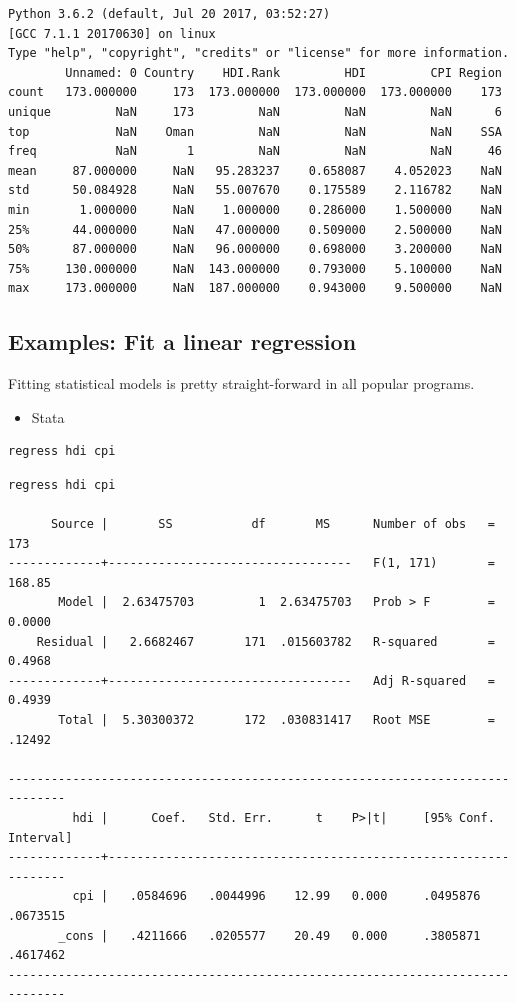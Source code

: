 \documentclass[]{book}
\providecommand{\tightlist}{%
  \setlength{\itemsep}{0pt}\setlength{\parskip}{0pt}}
\begin{document}
\begin{verbatim}
Python 3.6.2 (default, Jul 20 2017, 03:52:27) 
[GCC 7.1.1 20170630] on linux
Type "help", "copyright", "credits" or "license" for more information.
        Unnamed: 0 Country    HDI.Rank         HDI         CPI Region
count   173.000000     173  173.000000  173.000000  173.000000    173
unique         NaN     173         NaN         NaN         NaN      6
top            NaN    Oman         NaN         NaN         NaN    SSA
freq           NaN       1         NaN         NaN         NaN     46
mean     87.000000     NaN   95.283237    0.658087    4.052023    NaN
std      50.084928     NaN   55.007670    0.175589    2.116782    NaN
min       1.000000     NaN    1.000000    0.286000    1.500000    NaN
25%      44.000000     NaN   47.000000    0.509000    2.500000    NaN
50%      87.000000     NaN   96.000000    0.698000    3.200000    NaN
75%     130.000000     NaN  143.000000    0.793000    5.100000    NaN
max     173.000000     NaN  187.000000    0.943000    9.500000    NaN
\end{verbatim}

\hypertarget{examples-fit-a-linear-regression}{%
\subsection{Examples: Fit a linear regression}\label{examples-fit-a-linear-regression}}

Fitting statistical models is pretty straight-forward in all popular programs.

\begin{itemize}
\tightlist
\item
  Stata
\end{itemize}

\begin{verbatim}
regress hdi cpi
\end{verbatim}

\begin{verbatim}
regress hdi cpi

      Source |       SS           df       MS      Number of obs   =       173
-------------+----------------------------------   F(1, 171)       =    168.85
       Model |  2.63475703         1  2.63475703   Prob > F        =    0.0000
    Residual |   2.6682467       171  .015603782   R-squared       =    0.4968
-------------+----------------------------------   Adj R-squared   =    0.4939
       Total |  5.30300372       172  .030831417   Root MSE        =    .12492

------------------------------------------------------------------------------
         hdi |      Coef.   Std. Err.      t    P>|t|     [95% Conf. Interval]
-------------+----------------------------------------------------------------
         cpi |   .0584696   .0044996    12.99   0.000     .0495876    .0673515
       _cons |   .4211666   .0205577    20.49   0.000     .3805871    .4617462
------------------------------------------------------------------------------
\end{verbatim}
\end{document}
